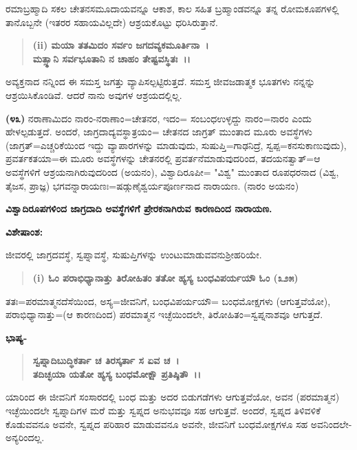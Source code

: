 
ರಮಾಬ್ರಹ್ಮಾದಿ ಸಕಲ ಚೇತನಸಮೂದಾಯವನ್ನೂ ಆಕಾಶ, ಕಾಲ ಸಹಿತ ಬ್ರಹ್ಮಾಂಡವನ್ನೂ ತನ್ನ ರೋಮಕೂಪಗಳಲ್ಲಿ ತಾನೊಬ್ಬನೇ (ಇತರರ ಸಹಾಯವಿಲ್ಲದೇ) ಆಶ್ರಯಕೊಟ್ಟು ಧರಿಸಿರುತ್ತಾನೆ.

\begin{verse}
\textbf{(ii) ಮಯಾ ತತಮಿದಂ ಸರ್ವಂ ಜಗದವ್ಯಕಮೂರ್ತಿನಾ~।}\\\textbf{ಮತ್ಸ್ಥಾನಿ ಸರ್ವಭೂತಾನಿ ನ ಚಾಹಂ ತೇಷ್ಟವಸ್ಥಿತಃ~।।}
\end{verse}

ಅವ್ಯಕ್ತನಾದ ನನ್ನಿಂದ ಈ ಸಮಸ್ತ ಜಗತ್ತು ವ್ಯಾಪಿಸಲ್ಪಟ್ಟಿರುತ್ತದೆ. ಸಮಸ್ತ ಜೀವಜಡಾತ್ಮಕ ಭೂತಗಳು ನನ್ನನ್ನು ಆಶ್ರಯಿಸಿಕೊಂಡಿವೆ. ಆದರೆ ನಾನು ಅವುಗಳ ಆಶ್ರಯದಲ್ಲಿಲ್ಲ.

\textbf{(೪೩)} ನರಾಣಾಮಿದಂ ನಾರಂ-ನರಾಣಾಂ=ಚೇತನರ, ಇದಂ= ಸಂಬಂಧಉಳ್ಳದ್ದು ನಾರಂ=ನಾರಂ ಎಂದು ಹೇಳಲ್ಪಡುತ್ತದೆ. ಅಂದರೆ, ಜಾಗ್ರದಾದ್ಯವಸ್ಥಾತ್ರಯಂ= ಚೇತನದ ಜಾಗ್ರತ್ ಮುಂತಾದ ಮೂರು ಅವಸ್ಥೆಗಳು (ಜಾಗ್ರತ್=ಎಚ್ಚರಿಕೆಯಿಂದ ಇದ್ದು ವ್ಯಾಪಾರಗಳನ್ನು ಮಾಡುವುದು, ಸುಷುಪ್ತಿ=ಗಾಢನಿದ್ರೆ, ಸ್ವಪ್ಪ=ಕನಸುಕಾಣುವುದು), ಪ್ರವರ್ತಕತಯಾ=ಈ ಮೂರು ಅವಸ್ಥೆಗಳನ್ನು ಚೇತನರಲ್ಲಿ ಪ್ರವರ್ತನೆಮಾಡುವುದರಿಂದ, ತದಯನತ್ವಾತ್=ಆ ಅವಸ್ಥೆಗಳಿಗೆ ಆಶ್ರಯನಾಗಿರುವುದರಿಂದ (ಅಯನಂ), ವಿಶ್ವಾದಿರೂಪೀ= "ವಿಶ್ವ" ಮುಂತಾದ ರೂಪಧರನಾದ (ವಿಶ್ವ, ತೈಜಸ, ಪ್ರಾಜ್ಞ) ಭಗವನ್ನಾರಾಯಣಃ=ಷಡ್ಗುಣೈಶ್ವರ್ಯ\-ಪೂರ್ಣನಾದ ನಾರಾಯಣ. (ನಾರಂ ಅಯನಂ)

\begin{center}
\textbf{ವಿಶ್ವಾದಿರೂಪಗಳಿಂದ ಜಾಗ್ರದಾದಿ ಅವಸ್ಥೆಗಳಿಗೆ ಪ್ರೇರಕನಾಗಿರುವ ಕಾರಣದಿಂದ ನಾರಾಯಣ.}
\end{center}

\noindent
\textbf{ವಿಶೇಷಾಂಶ:\enginline{-}}

ಜೀವರಲ್ಲಿ ಜಾಗ್ರದವಸ್ಥೆ, ಸ್ವಪ್ನಾವಸ್ಥೆ, ಸುಷುಪ್ತಿಗಳನ್ನು ಉಂಟುಮಾಡುವವನು\break ಶ‍್ರೀಹರಿಯೇ.

\begin{verse}
\textbf{(i) ಓಂ ಪರಾಭಿಧ್ಯಾನಾತ್ತು ತಿರೋಹಿತಂ ತತೋ ಹ್ಯಸ್ಯ ಬಂಧವಿಪರ್ಯಯೌ ಓಂ (೩\enginline{-}೨\enginline{-}೫)}
\end{verse}

ತತಃ=ಪರಮಾತ್ಮನದೆಸೆಯಿಂದ, ಅಸ್ಯ=ಜೀವನಿಗೆ, ಬಂಧವಿಪರ್ಯಯೌ= ಬಂಧಮೋಕ್ಷಗಳು (ಆಗುತ್ತವೆಯೋ), ಪರಾಭಿಧ್ಯಾನಾತ್ತು=(ಆ ಕಾರಣದಿಂದ) ಪರಮಾತ್ಮನ ಇಚ್ಛೆಯಿಂದಲೇ, ತಿರೋಹಿತಂ=ಸ್ವಪ್ನನಾಶವೂ ಆಗುತ್ತದೆ.

\noindent
\textbf{ಭಾಷ್ಯ-}

\begin{verse}
\textbf{ಸ್ವಪ್ನಾದಿಬುದ್ಧಿಕರ್ತಾ ಚ ತಿರಸ್ಕರ್ತಾ ಸ ಏವ ಚ~।}\\\textbf{ತದಿಚ್ಛಯಾ ಯತೋ ಹ್ಯಸ್ಯ ಬಂಧಮೋಕ್ಷೌ ಪ್ರತಿಷ್ಠಿತೌ~।।}
\end{verse}


ಯಾರಿಂದ ಈ ಜೀವನಿಗೆ ಸಂಸಾರದಲ್ಲಿ ಬಂಧ ಮತ್ತು ಅದರ ಬಿಡುಗಡೆಗಳು ಆಗುತ್ತ\-ವೆಯೋ, ಅವನ (ಪರಮಾತ್ಮನ) ಇಚ್ಛೆಯಿಂದಲೇ ಸ್ವಪ್ನಾದಿಗಳ ಮರೆ ಮತ್ತು ಸ್ವಪ್ನದ ಅನು\-ಭವವೂ ಸಹ ಆಗುತ್ತವೆ. ಅಂದರೆ, ಸ್ವಪ್ನದ ತಿಳಿವಳಿಕೆ ಕೊಡುವವನೂ ಅವನೇ, ಸ್ವಪ್ನದ ಪರಿಹಾರ ಮಾಡುವವನೂ ಅವನೇ, ಜೀವನಿಗೆ ಬಂಧಮೋಕ್ಷಗಳೂ ಸಹ ಅವನಿಂದಲೇ-ಅನ್ಯರಿಂದಲ್ಲ.

